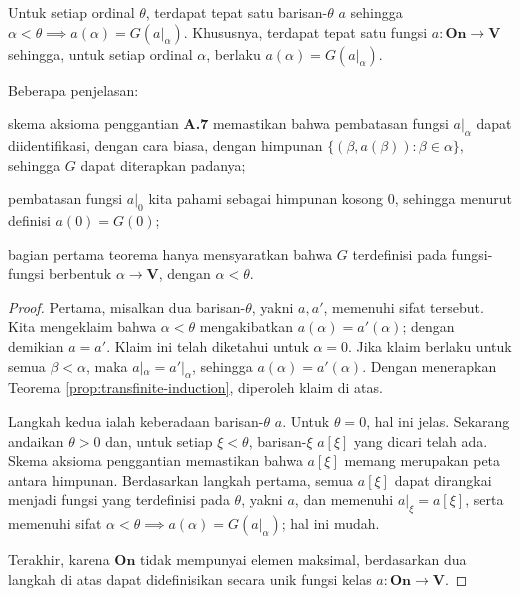 \begin{theorem}
	Untuk setiap ordinal $\theta$, terdapat tepat satu barisan-$\theta$ $a$ sehingga $\alpha < \theta \implies a(\alpha) = G(a|_\alpha)$. Khususnya, terdapat tepat satu fungsi $a: \textbf{On} \to \textbf{V}$ sehingga, untuk setiap ordinal $\alpha$, berlaku $a(\alpha) = G(a|_\alpha)$.
\end{theorem}
Beberapa penjelasan:
\begin{inparaenum}[(a)]
	\item skema aksioma penggantian \textbf{A.7} memastikan bahwa pembatasan fungsi $a|_\alpha$ dapat diidentifikasi, dengan cara biasa, dengan himpunan $\{ (\beta, a(\beta)) : \beta \in \alpha \}$, sehingga $G$ dapat diterapkan padanya;
	\item pembatasan fungsi $a|_0$ kita pahami sebagai himpunan kosong $0$, sehingga menurut definisi $a(0) = G(0)$;
	\item bagian pertama teorema hanya mensyaratkan bahwa $G$ terdefinisi pada fungsi-fungsi berbentuk $\alpha \to \textbf{V}$, dengan $\alpha < \theta$.
\end{inparaenum}
\begin{proof}
	Pertama, misalkan dua barisan-$\theta$, yakni $a, a'$, memenuhi sifat tersebut. Kita mengeklaim bahwa $\alpha < \theta$ mengakibatkan $a(\alpha) = a'(\alpha)$; dengan demikian $a=a'$. Klaim ini telah diketahui untuk $\alpha=0$. Jika klaim berlaku untuk semua $\beta < \alpha$, maka $a|_\alpha = a'|_\alpha$, sehingga $a(\alpha) = a'(\alpha)$. Dengan menerapkan Teorema \ref{prop:transfinite-induction}, diperoleh klaim di atas.
	
	Langkah kedua ialah keberadaan barisan-$\theta$ $a$. Untuk $\theta=0$, hal ini jelas. Sekarang andaikan $\theta > 0$ dan, untuk setiap $\xi < \theta$, barisan-$\xi$ $a[\xi]$ yang dicari telah ada. Skema aksioma penggantian memastikan bahwa $a[\xi]$ memang merupakan peta antara himpunan. Berdasarkan langkah pertama, semua $a[\xi]$ dapat dirangkai menjadi fungsi yang terdefinisi pada $\theta$, yakni $a$, dan memenuhi $a|_\xi = a[\xi]$, serta memenuhi sifat $\alpha < \theta \implies a(\alpha) = G(a|_\alpha)$; hal ini mudah.
	
	Terakhir, karena $\textbf{On}$ tidak mempunyai elemen maksimal, berdasarkan dua langkah di atas dapat didefinisikan secara unik fungsi kelas $a: \textbf{On} \to \textbf{V}$.
\end{proof}

